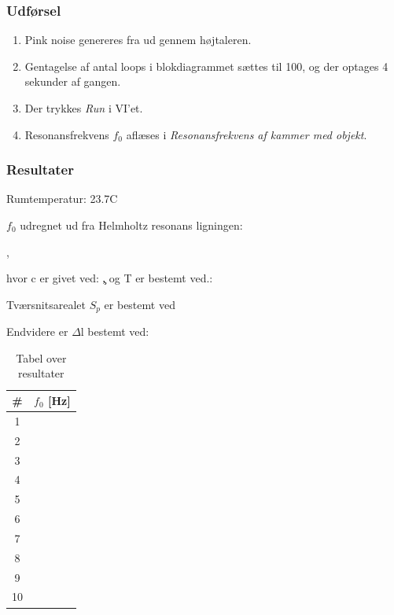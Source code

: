 		\subsubsection{Udførsel}
			
			\begin{enumerate}
			\item Pink noise genereres fra \onlineg  ud gennem højtaleren. 
			\item Gentagelse af antal loops i blokdiagrammet sættes til 100, og der optages 4 sekunder af gangen. 
			\item Der trykkes \textit{Run} i VI'et. 
			\item Resonansfrekvens $f_{0}$ aflæses i \textit{Resonansfrekvens af kammer med objekt}.
			\end{enumerate}
			
	\subsubsection{Resultater}
	
	Rumtemperatur: 23.7\degree C
	
	$f_{0}$ udregnet ud fra Helmholtz resonans ligningen:
	
		\fnul,
		
		hvor c er givet ved: 
		\c, og T er bestemt ved.: 
		\T
		
		Tværsnitsarealet $S_{p}$ er bestemt ved
		
		Endvidere er $\Delta$l bestemt ved: 
		\deltal
		\Sp
	
	

	
	
			
		\begin{table}[]
\centering
\caption{Tabel over resultater}
\label{bordtest6resultater}
\begin{tabular}{c|l}
\textbf{\#}& \textbf{$f_{0}$ {[Hz]}} \\
\hline
1  &                  \\
2  &                  \\
3  &                  \\
4  &                  \\
5  &                  \\
6  &                  \\
7  &                  \\
8  &                  \\
9  &                  \\
10 &                 
\end{tabular}
\end{table}
			


